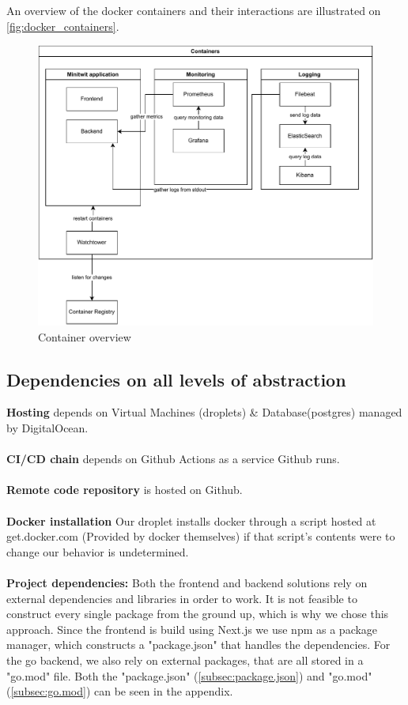 An overview of the docker containers and their interactions are illustrated on \autoref{fig:docker_containers}.

\begin{figure}[H]
    \centering
    \includegraphics[scale=0.8]{report/diagrams/containers.pdf}
    \caption{Container overview}
    \label{fig:docker_containers}
\end{figure}

\subsection{Dependencies on all levels of abstraction}
\textbf{Hosting} depends on Virtual Machines (droplets) \& Database(postgres) managed by DigitalOcean. 
\\\\
\textbf{CI/CD chain} depends on Github Actions as a service Github runs. 
\\\\
\textbf{Remote code repository} is hosted on Github.
\\\\
\textbf{Docker installation} Our droplet installs docker through a script hosted at get.docker.com (Provided by docker themselves) if that script's contents were to change our behavior is undetermined.
\\\\
\textbf{Project dependencies:} Both the frontend and backend solutions rely on external dependencies and libraries in order to work. It is not feasible to construct every single package from the ground up, which is why we chose this approach. Since the frontend is build using Next.js we use npm as a package manager, which constructs a "package.json" that handles the dependencies. For the go backend, we also rely on external packages, that are all stored in a "go.mod" file. Both the "package.json" (\ref{subsec:package.json}) and "go.mod" (\ref{subsec:go.mod}) can be seen in the appendix.

